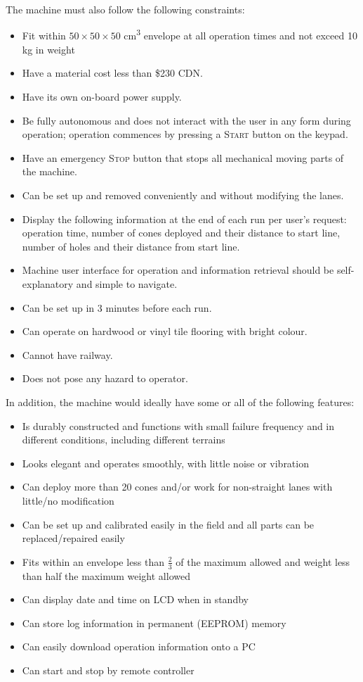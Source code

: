 \documentclass[11pt]{report}
\begin{document}
The machine must also follow the following constraints:

\begin{itemize}
\item{Fit within $50\times 50\times 50$ cm\textsuperscript{3} envelope at all operation times and not exceed 10 kg in weight}
\item{Have a material cost less than \$230 CDN.}
    \item{Have its own on-board power supply.}
    \item{Be fully autonomous and does not interact with the user in any form during operation; operation commences by pressing a \textsc{Start} button on the keypad.}
    \item{Have an emergency \textsc{Stop} button that stops all mechanical moving parts of the machine.}
    \item{Can be set up and removed conveniently and without modifying the lanes.}
    \item{Display the following information at the end of each run per user's request: operation time, number of cones deployed and their distance to start line, number of holes and their distance from start line.}
    \item{Machine user interface for operation and information retrieval should be self-explanatory and simple to navigate.}
    \item{Can be set up in 3 minutes before each run.}
    \item{Can operate on hardwood or vinyl tile flooring with bright colour.}
    \item{Cannot have railway.}
    \item{Does not pose any hazard to operator.}
\end{itemize}
In addition, the machine would ideally have some or all of the following features:
\begin{itemize}
\item{Is durably constructed and functions with small failure frequency and in different conditions, including different terrains}
\item{Looks elegant and operates smoothly, with little noise or vibration}
\item{Can deploy more than 20 cones and/or work for non-straight lanes with little/no modification}
\item{Can be set up and calibrated easily in the field and all parts can be replaced/repaired easily}
\item{Fits within an envelope less than $\frac{2}{3}$ of the maximum allowed and weight less than half the maximum weight allowed}
\item{Can display date and time on LCD when in standby}
\item{Can store log information in permanent (EEPROM) memory}
\item{Can easily download operation information onto a PC}
\item{Can start and stop by remote controller}
\end{itemize}
\end{document}

